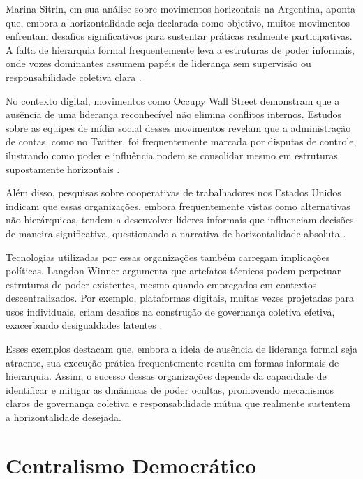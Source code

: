 Marina Sitrin, em sua análise sobre movimentos horizontais na Argentina,
aponta que, embora a horizontalidade seja declarada como objetivo, muitos
movimentos enfrentam desafios significativos para sustentar práticas
realmente participativas. A falta de hierarquia formal frequentemente leva
a estruturas de poder informais, onde vozes dominantes assumem papéis de
liderança sem supervisão ou responsabilidade coletiva clara
\cite{EverydayRevolutions}.

No contexto digital, movimentos como Occupy Wall Street demonstram que a
ausência de uma liderança reconhecível não elimina conflitos internos.
Estudos sobre as equipes de mídia social desses movimentos revelam que a
administração de contas, como no Twitter, foi frequentemente marcada por
disputas de controle, ilustrando como poder e influência podem se
consolidar mesmo em estruturas supostamente horizontais
\cite{SocialMediaTeamsAsDigitalVanguards}.

Além disso, pesquisas sobre cooperativas de trabalhadores nos Estados
Unidos indicam que essas organizações, embora frequentemente vistas como
alternativas não hierárquicas, tendem a desenvolver líderes informais que
influenciam decisões de maneira significativa, questionando a narrativa de
horizontalidade absoluta \cite{WorkerCooperativesandRevolution}.

Tecnologias utilizadas por essas organizações também carregam implicações
políticas. Langdon Winner argumenta que artefatos técnicos podem perpetuar
estruturas de poder existentes, mesmo quando empregados em contextos
descentralizados. Por exemplo, plataformas digitais, muitas vezes
projetadas para usos individuais, criam desafios na construção de
governança coletiva efetiva, exacerbando desigualdades latentes
\cite{DoArtifactsHavePolitics}.

Esses exemplos destacam que, embora a ideia de ausência de liderança formal
seja atraente, sua execução prática frequentemente resulta em formas
informais de hierarquia. Assim, o sucesso dessas organizações depende da
capacidade de identificar e mitigar as dinâmicas de poder ocultas,
promovendo mecanismos claros de governança coletiva e responsabilidade
mútua que realmente sustentem a horizontalidade desejada.

\section{Centralismo Democrático}
\label{sec:centralismo_democratico}

